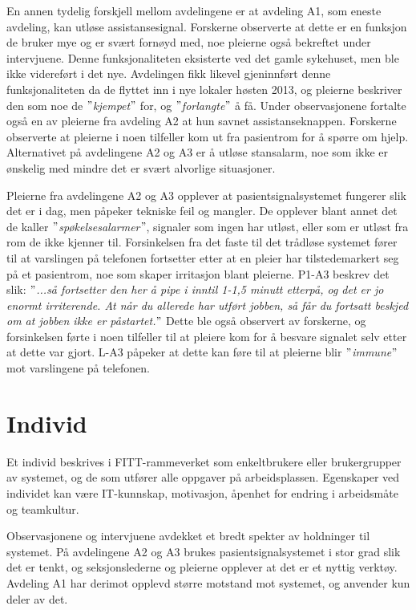 \noindent
En annen tydelig forskjell mellom avdelingene er at avdeling A1, som eneste avdeling, kan utløse assistansesignal. Forskerne observerte at dette er en funksjon de bruker mye og er svært fornøyd med, noe pleierne også bekreftet under intervjuene. Denne funksjonaliteten eksisterte ved det gamle sykehuset, men ble ikke videreført i det nye. Avdelingen fikk likevel gjeninnført denne funksjonaliteten da de flyttet inn i nye lokaler høsten 2013, og pleierne beskriver den som noe de \textit{$"$kjempet$"$} for, og \textit{$"$forlangte$"$} å få. Under observasjonene fortalte også en av pleierne fra avdeling A2 at hun savnet assistanseknappen. Forskerne observerte at pleierne i noen tilfeller kom ut fra pasientrom for å spørre om hjelp. Alternativet på avdelingene A2 og A3 er å utløse stansalarm, noe som ikke er ønskelig med mindre det er svært alvorlige situasjoner.

\noindent
Pleierne fra avdelingene A2 og A3 opplever at pasientsignalsystemet fungerer slik det er i dag, men påpeker tekniske feil og mangler. De opplever blant annet det de kaller \textit{$"$spøkelsesalarmer$"$}, signaler som ingen har utløst, eller som er utløst fra rom de ikke kjenner til. Forsinkelsen fra det faste til det trådløse systemet fører til at varslingen på telefonen fortsetter etter at en pleier har tilstedemarkert seg på et pasientrom, noe som skaper irritasjon blant pleierne. P1-A3 beskrev det slik: \textit{$"$...så fortsetter den her å pipe i inntil 1-1,5 minutt etterpå, og det er jo enormt irriterende. At når du allerede har utført jobben, så får du fortsatt beskjed om at jobben ikke er påstartet.$"$} Dette ble også observert av forskerne, og forsinkelsen førte i noen tilfeller til at pleiere kom for å besvare signalet selv etter at dette var gjort. L-A3 påpeker at dette kan føre til at pleierne blir \textit{$"$immune$"$} mot varslingene på telefonen.

\section{Individ}
Et individ beskrives i FITT-rammeverket som enkeltbrukere eller brukergrupper av systemet, og de som utfører alle oppgaver på arbeidsplassen. Egenskaper ved individet kan være IT-kunnskap, motivasjon, åpenhet for endring i arbeidsmåte og teamkultur.

\noindent
Observasjonene og intervjuene avdekket et bredt spekter av holdninger til systemet. På avdelingene A2 og A3 brukes pasientsignalsystemet i stor grad slik det er tenkt, og seksjonslederne og pleierne opplever at det er et nyttig verktøy. Avdeling A1 har derimot opplevd større motstand mot systemet, og anvender kun deler av det.

